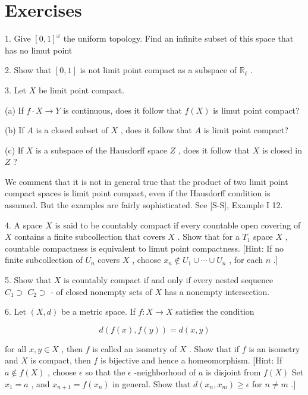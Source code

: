 \documentclass[10pt]{article}
\begin{document}
\section*{Exercises}

1. Give \({\left\lbrack  0,1\right\rbrack  }^{\omega }\) the uniform topology. Find an infinite subset of this space that has no limut point

2. Show that \(\left\lbrack  {0,1}\right\rbrack\) is not limit point compact as a subspace of \({\mathbb{R}}_{\ell }\) .

3. Let \(X\) be limit point compact.

(a) If \(f \cdot  X \rightarrow  Y\) is continuous, does it follow that \(f\left( X\right)\) is limut point compact?

(b) If \(A\) is a closed subset of \(X\) , does it follow that \(A\) is limit point compact?

(c) If \(X\) is a subspace of the Hausdorff space \(Z\) , does it follow that \(X\) is closed in \(Z\) ?

We comment that it is not in general true that the product of two limit point compact spaces is limit point compact, even if the Hausdorff condition is assumed. But the examples are fairly sophisticated. See [S-S], Example I 12.

4. A space \(X\) is said to be countably compact if every countable open covering of \(X\) contains a finite subcollection that covers \(X\) . Show that for a \({T}_{1}\) space \(X\) , countable compactness is equivalent to limut point compactness. [Hint: If no finite subcollection of \({U}_{n}\) covers \(X\) , choose \({x}_{n} \notin  {U}_{1} \cup  \cdots  \cup  {U}_{n}\) , for each \(n\) .]

5. Show that \(X\) is countably compact if and only if every nested sequence \({C}_{1} \supset \; {C}_{2} \supset\) - of closed nonempty sets of \(X\) has a nonempty intersection.

6. Let \(\left( {X,d}\right)\) be a metric space. If \(f : X \rightarrow  X\) satisfies the condition

\[
d\left( {f\left( x\right) ,f\left( y\right) }\right)  = d\left( {x,y}\right)
\]

for all \(x,y \in  X\) , then \(f\) is called an isometry of \(X\) . Show that if \(f\) is an isometry and \(X\) is compact, then \(f\) is bijective and hence a homeomorphism. [Hint: If \(a \notin  f\left( X\right)\) , choose \(\epsilon\) so that the \(\epsilon\) -neighborhood of \(a\) is disjoint from \(f\left( X\right)\) Set \({x}_{1} = a\) , and \({x}_{n + 1} = f\left( {x}_{n}\right)\) in general. Show that \(d\left( {{x}_{n},{x}_{m}}\right)  \geq  \epsilon\) for \(n \neq  m\) .]
\end{document}
